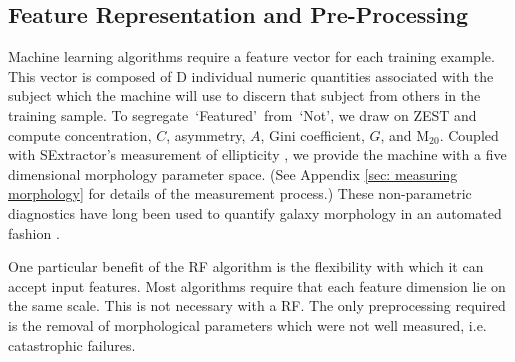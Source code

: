 \documentclass[twocolumn]{aastex6}
\newcommand{\feat}{`Featured'}
\newcommand{\notfeat}{`Not'}
\begin{document}
\subsection{Feature Representation and Pre-Processing}
Machine learning algorithms require a feature vector for each training example. 
This vector is composed of D individual numeric quantities associated with the 
subject which the machine will use to discern that subject from others in the 
training sample. To segregate~\feat~from~\notfeat, we draw
on ZEST \citep{Scarlata2007} and compute concentration, $C$, asymmetry, $A$, 
Gini coefficient, $G$, and M$_{20}$. Coupled with SExtractor's measurement 
of ellipticity \citep{sextractor}, we provide the machine with a five dimensional morphology parameter space. 
(See Appendix \ref{sec: measuring morphology} for details of the measurement process.)
These non-parametric diagnostics have long been used to 
quantify galaxy morphology in an automated fashion \cite[e.g.,][]{Abraham1996, Bershady2000, Conselice2000, Abraham2003, Conselice2003, Lotz2004, Snyder2015}.

One particular benefit of the RF algorithm is the flexibility with which it can accept input 
features. Most algorithms require that each feature dimension lie on the same scale. 
This is not necessary with a RF. The only preprocessing required is the removal of morphological parameters which were not well measured, i.e. catastrophic failures. 

\end{document}
